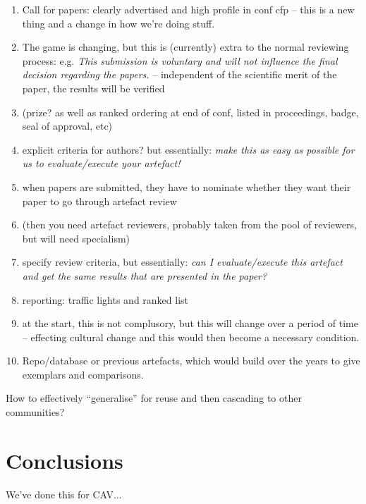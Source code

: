 \documentclass{llncs}
\begin{document}
\begin{enumerate}
\item Call for papers: clearly advertised and high profile in conf cfp
  -- this is a new thing and a change in how we're doing stuff.
\item The game is changing, but this is (currently) extra to the
  normal reviewing process: 
e.g. {\emph{This submission is voluntary and will not influence the final decision
regarding the papers.}} -- independent of the scientific merit of the
paper, the results will be verified 
\item (prize? as well as ranked ordering at end of conf, listed in
  proceedings, badge, seal of approval, etc)
\item explicit criteria for authors? but essentially: {\emph{make this
      as easy as possible for us to evaluate/execute your artefact!}}
\item when papers are submitted, they have to nominate whether they
  want their paper to go through artefact review
\item (then you need artefact reviewers, probably taken from the pool of
  reviewers, but will need specialism)
\item specify review criteria, but essentially: {\emph{can I evaluate/execute this
  artefact and get the same results that are presented in the paper?}}
\item reporting: traffic lights and ranked list
\item at the start, this is not complusory, but this will change over a period of
time -- effecting cultural change and this would then become a
necessary condition.
\item Repo/database or previous artefacts, which would build over the
  years to give exemplars and comparisons.
\end{enumerate}

How to effectively ``generalise'' for reuse and then cascading to other communities?

\section{Conclusions}\label{concl}
We've done this for CAV...





\end{document}
